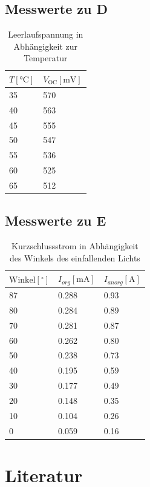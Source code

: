 \documentclass[slug=SZ, room=Hermann-Krone-Bau\,\ Labor\ 1.25, supervisor=Martin\ Kroll]{../../Lab_Report_LaTeX/lab_report}
\newcommand{\voc}{V_{\text{OC}}}
\begin{document}
\subsection{Messwerte zu D}

\begin{table}[H]
	\centering
	\begin{tabular}{l|l}
		\toprule
		\(T [\si{\degreeCelsius}]\) & \(\voc [\si{\milli\volt}]\)\\
		\midrule
		35 & 570 \\
		40 & 563 \\
		45 & 555 \\
		50 & 547 \\
		55 & 536 \\
		60 & 525 \\
		65 & 512
	\end{tabular}
	\caption{Leerlaufspannung in Abhängigkeit zur Temperatur}
	\label{tab:messd}
\end{table}

\subsection{Messwerte zu E}

\begin{table}[H]
	\centering
	\begin{tabular}{l|l|l}
		\toprule
		\(\text{Winkel} [^\circ]\) & \(I_{org} [\si{\milli\ampere}]\) &\(I_{anorg} [\si{\ampere}]\) \\
		\midrule
		87 & 0.288 & 0.93 \\
		80 & 0.284 & 0.89 \\
		70 & 0.281 & 0.87 \\
		60 & 0.262 & 0.80 \\
		50 & 0.238 & 0.73 \\
		40 & 0.195 & 0.59 \\
		30 & 0.177 & 0.49 \\
		20 & 0.148 & 0.35 \\
		10 & 0.104 & 0.26 \\
		0 & 0.059 & 0.16 \\
	\end{tabular}
	\caption{Kurzschlussstrom in Abhängigkeit des Winkels des einfallenden Lichts}
	\label{tab:messe}
\end{table}

\section{Literatur}

\label{sec:literatur}

\printbibliography
\end{document}
